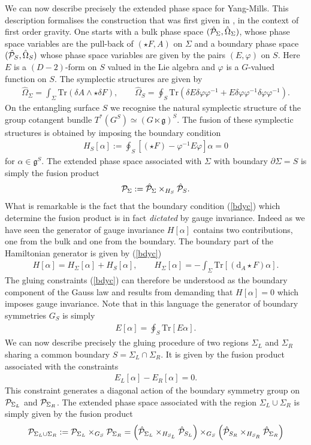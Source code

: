 \documentclass[a4paper,11pt]{article}
\newcommand{\beq}{\begin{eqnarray}}
\newcommand{\eeq}{\end{eqnarray}}
\def\rd{\mathrm{d}}
\newcommand{\Tr}{\mbox{Tr}}
\begin{document}
We can now describe precisely the extended phase space for Yang-Mills.
This description formalises the construction that was first given in \cite{Freidel:2015gpa}, in the context of first order gravity.
One starts with a bulk phase space $(\hat{\cal P}_{{\Sigma}},\hat{\Omega}_{\Sigma})$, whose phase space variables are the pull-back of $(\star F , A) $ on $\Sigma$ and a boundary phase space 
$(\hat{\cal P}_{S},\hat{\Omega}_{S})$ whose phase space variables are given by  the pairs  $(E , \varphi) $ on $S$. 
Here $E$ is a $(D-2)$-form on $S$ valued in the Lie algebra and $\varphi$ is a $G$-valued function on $S$.
The symplectic structures are given by 
\beq
\hat{\Omega}_{\Sigma} =\int_\Sigma \Tr( \delta A\wedge \star \delta F ),\qquad \hat{\Omega}_{S} =\oint_S \Tr( \delta E   \delta \varphi \varphi^{-1}  + E  \delta \varphi\varphi^{-1} \delta \varphi \varphi^{-1} ).
\eeq
On the entangling surface $S$ we recognise the natural symplectic structure of the group  cotangent bundle  $T^*(G^S) \simeq (G \ltimes \mathfrak{g})^S$.
The fusion of these symplectic structures is obtained by imposing the boundary condition 
\beq\label{bdyc}
H_S[\alpha]  := \oint_S \left[\left(\star  F  \right) -\varphi^{-1} E \varphi \right]\alpha =0
\eeq
for $\alpha \in \mathfrak{g}^S$.
The extended phase space associated with $\Sigma$ with boundary $\partial \Sigma =S$ is simply the fusion product
\beq
{\cal P}_{{\Sigma}} := \hat{\cal P}_{{\Sigma}} \times_{H_S}\hat{\cal P}_{{S}}.
\eeq
What is remarkable is the fact that the boundary condition (\ref{bdyc}) which determine the fusion product is in fact {\it dictated} by  gauge invariance. Indeed as we have seen the generator of gauge invariance $H[\alpha]$  contains two contributions, one from the bulk and one from the boundary. The boundary part of the Hamiltonian generator is given by (\ref{bdyc})
\beq
H[\alpha]= H_\Sigma[\alpha] + H_S[\alpha],\qquad 
 H_\Sigma[\alpha] = -\int_\Sigma \Tr[(\rd_A \star F)\alpha].
 \eeq
 The gluing constraints (\ref{bdyc}) can therefore be understood as the boundary component of the Gauss law and results from demanding that $H[\alpha]=0$ which imposes gauge invariance. 
 Note that in this language the generator of boundary symmetries $G_S$ is simply 
 \beq
E[\alpha] = \oint_S \Tr[E\alpha].
\eeq
 We can now describe precisely the gluing procedure of two regions $\Sigma_L$ and $\Sigma_R$ sharing a common boundary $S = \Sigma_L \cap \Sigma_R$. It is given by the fusion product associated with  the constraints
 \beq
E_L[\alpha] - E_R[\alpha] =0.
\eeq
This constraint generates a diagonal action of the boundary symmetry group on ${\cal P}_{\Sigma_L}$ and ${\cal P}_{\Sigma_R}$. 
The extended phase space associated with the region $\Sigma_L\cup \Sigma_R$ is simply given by the fusion product
\beq
{\cal P}_{\Sigma_L\cup \Sigma_R} := 
{\cal P}_{\Sigma_L} \times_{G_S} 
{\cal P}_{ \Sigma_R}=
\left( \hat{\cal P}_{{\Sigma_L}} \times_{H_{S_L}}\hat{\cal P}_{{S_L}} \right) \times_{G_S}
\left(
\hat{\cal P}_{{S_R}} \times_{H_{S_R}} 
\hat{\cal P}_{{\Sigma_R}} 
\right)
\eeq
\end{document}
